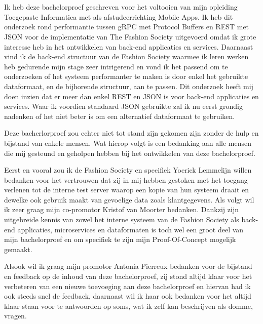 
\chapter*{}
\label{ch:voorwoord}
Ik heb deze bachelorproef geschreven voor het voltooien van mijn opleiding Toegepaste Informatica met als afstudeerrichting Mobile Apps. Ik heb dit onderzoek rond performantie tussen gRPC met Protocol Buffers en REST met JSON voor de implementatie van The Fashion Society uitgevoerd omdat ik grote interesse heb in het ontwikkelen van back-end applicaties en services. Daarnaast vind ik de back-end structuur van de Fashion Society waarmee ik leren werken heb gedurende mijn stage zeer intrigerend en vond ik het passend om te onderzoeken of het systeem performanter te maken is door enkel het gebruikte dataformaat, en de bijhorende structuur, aan te passen.
Dit onderzoek heeft mij doen inzien dat er meer dan enkel REST en JSON is voor back-end applicaties en services. Waar ik voordien standaard JSON gebruikte zal ik nu eerst grondig nadenken of het niet beter is om een alternatief dataformaat te gebruiken.

Deze bacherlorproef zou echter niet tot stand zijn gekomen zijn zonder de hulp en bijstand van enkele mensen. Wat hierop volgt is een bedanking aan alle mensen die mij gesteund en geholpen hebben bij het ontwikkelen van deze bachelorproef.
 
Eerst en vooral zou ik de Fashion Society en specifiek Yoerick Lemmelijn willen bedanken voor het vertrouwen dat zij in mij hebben gestoken met het toegang verlenen tot de interne test server waarop een kopie van hun systeem draait en dewelke ook gebruik maakt van gevoelige data zoals klantgegevens. Als volgt wil ik zeer graag mijn co-promotor Kristof van Moorter bedanken. Dankzij zijn uitgebreide kennis van zowel het interne systeem van de Fashion Society als back-end applicaties, microservices en dataformaten is toch wel een groot deel van mijn bachelorproef en om specifiek te zijn mijn Proof-Of-Concept mogelijk gemaakt.

Alsook wil ik graag mijn promotor Antonia Pierreux bedanken voor de bijstand en feedback op de inhoud van deze bachelorproef, zij stond altijd klaar voor het verbeteren van een nieuwe toevoeging aan deze bachelorproef en hiervan had ik ook steeds snel de feedback, daarnaast wil ik haar ook bedanken voor het altijd klaar staan voor te antwoorden op soms, wat ik zelf kan beschrijven als domme, vragen.

